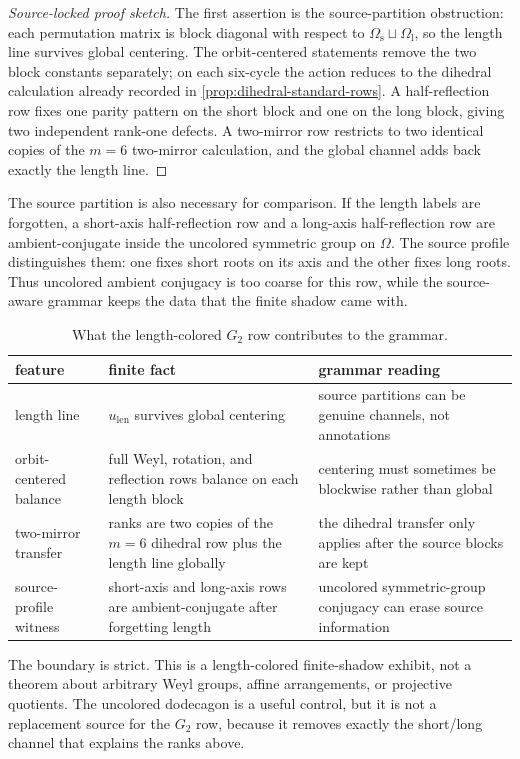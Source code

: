 \begin{proof}[Source-locked proof sketch]
The first assertion is the source-partition obstruction: each permutation matrix is block diagonal with respect to \(\Omega_{\mathrm{s}}\sqcup\Omega_{\mathrm{l}}\), so the length line survives global centering.  The orbit-centered statements remove the two block constants separately; on each six-cycle the action reduces to the dihedral calculation already recorded in \cref{prop:dihedral-standard-rows}.  A half-reflection row fixes one parity pattern on the short block and one on the long block, giving two independent rank-one defects.  A two-mirror row restricts to two identical copies of the \(m=6\) two-mirror calculation, and the global channel adds back exactly the length line.
\end{proof}

The source partition is also necessary for comparison.  If the length labels are forgotten, a short-axis half-reflection row and a long-axis half-reflection row are ambient-conjugate inside the uncolored symmetric group on \(\Omega\).  The source profile distinguishes them: one fixes short roots on its axis and the other fixes long roots.  Thus uncolored ambient conjugacy is too coarse for this row, while the source-aware grammar keeps the data that the finite shadow came with.

\begin{table}[!htbp]
\centering
\caption{What the length-colored \(G_2\) row contributes to the grammar.}
\label{tab:g2-source-channel}
\begin{tabular}{@{}L{0.23\textwidth}L{0.31\textwidth}L{0.34\textwidth}@{}}
\toprule
feature & finite fact & grammar reading \\
\midrule
length line & \(u_{\mathrm{len}}\) survives global centering & source partitions can be genuine channels, not annotations \\
orbit-centered balance & full Weyl, rotation, and reflection rows balance on each length block & centering must sometimes be blockwise rather than global \\
two-mirror transfer & ranks are two copies of the \(m=6\) dihedral row plus the length line globally & the dihedral transfer only applies after the source blocks are kept \\
source-profile witness & short-axis and long-axis rows are ambient-conjugate after forgetting length & uncolored symmetric-group conjugacy can erase source information \\
\bottomrule
\end{tabular}
\end{table}

The boundary is strict.  This is a length-colored finite-shadow exhibit, not a theorem about arbitrary Weyl groups, affine arrangements, or projective quotients.  The uncolored dodecagon is a useful control, but it is not a replacement source for the \(G_2\) row, because it removes exactly the short/long channel that explains the ranks above.
